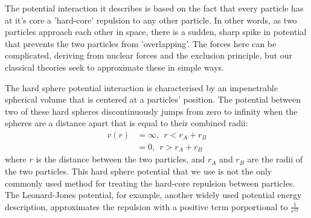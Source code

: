 The potential interaction it describes is based on the fact that every
particle has at it's core a 'hard-core' repulsion to any other
particle.  In other words, as two particles approach each other in
space, there is a sudden, sharp spike in potential that prevents the
two particles from 'overlapping'.  The forces here can be complicated,
deriving from nuclear forces and the exclusion principle, but our
classical theories seek to approximate these in simple ways.  

The hard sphere potential interaction is characterised by an
impenetrable spherical volume that is centered at a particles'
position.  The potential between two of these hard spheres discontinuously jumps from zero to infinity when the
spheres are a distance apart that is equal to their combined radii:
\begin{align}
  v(r) &= \infty,~~ r < r_A + r_B \\
  &= 0,~~ r > r_A + r_B
\end{align}
where $r$ is the distance between the two particles, and $r_A$ and
$r_B$ are the radii of the two particles.  This hard sphere potential that we use is not the only commonly used method for treating the hard-core repulsion between particles.  The Leonard-Jones potential,
for example, another widely used potential energy description, approximates the
repulsion with a positive term porportional to $\frac{1}{r^{12}}$



